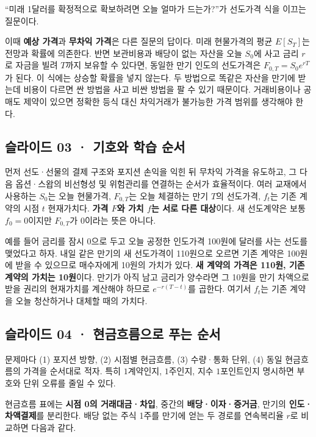 \documentclass[11pt,a4paper]{article}
\begin{document}
“미래 1달러를 확정적으로 확보하려면 오늘 얼마가 드는가?”가 선도가격 식을 이끄는 질문이다.\par

이때 \textbf{예상 가격}과 \textbf{무차익 가격}은 다른 질문의 답이다. 미래 현물가격의 평균 $E[S_T]$는 전망과 확률에 의존한다. 반면 보관비용과 배당이 없는 자산을 오늘 $S_0$에 사고 금리 $r$로 자금을 빌려 $T$까지 보유할 수 있다면, 동일한 만기 인도의 선도가격은 $F_{0,T}=S_0e^{rT}$가 된다. 이 식에는 상승할 확률을 넣지 않는다. 두 방법으로 똑같은 자산을 만기에 받는데 비용이 다르면 싼 방법을 사고 비싼 방법을 팔 수 있기 때문이다. 거래비용이나 공매도 제약이 있으면 정확한 등식 대신 차익거래가 불가능한 가격 범위를 생각해야 한다.\par

\subsection{슬라이드 03 · 기호와 학습 순서}
먼저 선도·선물의 결제 구조와 포지션 손익을 익힌 뒤 무차익 가격을 유도하고, 그 다음 옵션·스왑의 비선형성 및 위험관리를 연결하는 순서가 효율적이다. 여러 교재에서 사용하는 $S_0$는 오늘 현물가격, $F_{0,T}$는 오늘 체결하는 만기 $T$의 선도가격, $f_t$는 기존 계약의 시점 $t$ 현재가치다. \textbf{가격 $F$와 가치 $f$는 서로 다른 대상}이다. 새 선도계약은 보통 $f_0=0$이지만 $F_{0,T}$가 0이라는 뜻은 아니다.\par

예를 들어 금리를 잠시 0으로 두고 오늘 공정한 인도가격 100원에 달러를 사는 선도를 맺었다고 하자. 내일 같은 만기의 새 선도가격이 110원으로 오르면 기존 계약은 100원에 받을 수 있으므로 매수자에게 10원의 가치가 있다. \textbf{새 계약의 가격은 110원, 기존 계약의 가치는 10원}이다. 만기가 아직 남고 금리가 양수라면 그 10원을 만기 차액으로 받을 권리의 현재가치를 계산해야 하므로 $e^{-r(T-t)}$를 곱한다. 여기서 $f_t$는 기존 계약을 오늘 청산하거나 대체할 때의 가치다.\par

\subsection{슬라이드 04 · 현금흐름으로 푸는 순서}
문제마다 (1) 포지션 방향, (2) 시점별 현금흐름, (3) 수량·통화 단위, (4) 동일 현금흐름의 가격을 순서대로 적자. 특히 $1$계약인지, $1$주인지, 지수 $1$포인트인지 명시하면 부호와 단위 오류를 줄일 수 있다.\par

현금흐름 표에는 \textbf{시점 0의 거래대금·차입}, 중간의 \textbf{배당·이자·증거금}, 만기의 \textbf{인도·차액결제}를 분리한다. 배당 없는 주식 1주를 만기에 얻는 두 경로를 연속복리율 $r$로 비교하면 다음과 같다.\par
\end{document}
